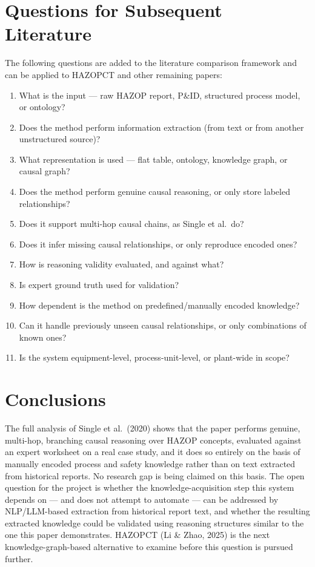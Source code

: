 \section{Questions for Subsequent Literature}
The following questions are added to the literature comparison framework and can be applied to HAZOPCT and other remaining papers:
\begin{enumerate}
  \item What is the input --- raw HAZOP report, P\&ID, structured process model, or ontology?
  \item Does the method perform information extraction (from text or from another unstructured source)?
  \item What representation is used --- flat table, ontology, knowledge graph, or causal graph?
  \item Does the method perform genuine causal reasoning, or only store labeled relationships?
  \item Does it support multi-hop causal chains, as Single et al.\ do?
  \item Does it infer missing causal relationships, or only reproduce encoded ones?
  \item How is reasoning validity evaluated, and against what?
  \item Is expert ground truth used for validation?
  \item How dependent is the method on predefined/manually encoded knowledge?
  \item Can it handle previously unseen causal relationships, or only combinations of known ones?
  \item Is the system equipment-level, process-unit-level, or plant-wide in scope?
\end{enumerate}

\section{Conclusions}
The full analysis of Single et al.\ (2020) shows that the paper performs genuine, multi-hop, branching causal reasoning over HAZOP concepts, evaluated against an expert worksheet on a real case study, and it does so entirely on the basis of manually encoded process and safety knowledge rather than on text extracted from historical reports. No research gap is being claimed on this basis. The open question for the project is whether the knowledge-acquisition step this system depends on --- and does not attempt to automate --- can be addressed by NLP/LLM-based extraction from historical report text, and whether the resulting extracted knowledge could be validated using reasoning structures similar to the one this paper demonstrates. HAZOPCT (Li \& Zhao, 2025) is the next knowledge-graph-based alternative to examine before this question is pursued further.

